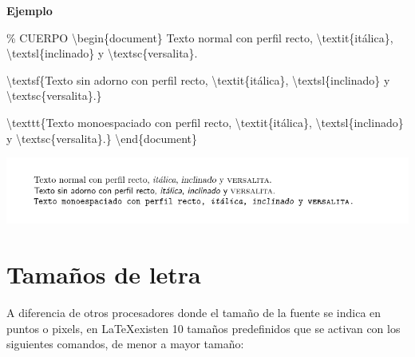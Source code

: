 \documentclass[
  letterpaper,
  DIV=11,
  numbers=noendperiod]{scrreport}
\newenvironment{Shaded}{\begin{snugshade}}{\end{snugshade}}
\newcommand{\CommentTok}[1]{\textcolor[rgb]{0.37,0.37,0.37}{#1}}
\newcommand{\ExtensionTok}[1]{\textcolor[rgb]{0.00,0.23,0.31}{#1}}
\newcommand{\FunctionTok}[1]{\textcolor[rgb]{0.28,0.35,0.67}{#1}}
\newcommand{\KeywordTok}[1]{\textcolor[rgb]{0.00,0.23,0.31}{#1}}
\newcommand{\NormalTok}[1]{\textcolor[rgb]{0.00,0.23,0.31}{#1}}
\begin{document}
\textbf{Ejemplo}

\begin{Shaded}
\begin{Highlighting}[]
\CommentTok{\% CUERPO}
\KeywordTok{\textbackslash{}begin}\NormalTok{\{}\ExtensionTok{document}\NormalTok{\}}
\NormalTok{Texto normal con perfil recto, }\FunctionTok{\textbackslash{}textit}\NormalTok{\{itálica\}, }\FunctionTok{\textbackslash{}textsl}\NormalTok{\{inclinado\} y }
\FunctionTok{\textbackslash{}textsc}\NormalTok{\{versalita\}.}

\FunctionTok{\textbackslash{}textsf}\NormalTok{\{Texto sin adorno con perfil recto, }\FunctionTok{\textbackslash{}textit}\NormalTok{\{itálica\}, }
\FunctionTok{\textbackslash{}textsl}\NormalTok{\{inclinado\} y }\FunctionTok{\textbackslash{}textsc}\NormalTok{\{versalita\}.\}}

\FunctionTok{\textbackslash{}texttt}\NormalTok{\{Texto monoespaciado con perfil recto, }\FunctionTok{\textbackslash{}textit}\NormalTok{\{itálica\}, }
\FunctionTok{\textbackslash{}textsl}\NormalTok{\{inclinado\} y }\FunctionTok{\textbackslash{}textsc}\NormalTok{\{versalita\}.\}}
\KeywordTok{\textbackslash{}end}\NormalTok{\{}\ExtensionTok{document}\NormalTok{\}}
\end{Highlighting}
\end{Shaded}

\begin{tcolorbox}[enhanced jigsaw, arc=.35mm, toprule=.15mm, opacitybacktitle=0.6, colback=white, coltitle=black, colbacktitle=quarto-callout-note-color!10!white, breakable, colframe=quarto-callout-note-color-frame, left=2mm, opacityback=0, bottomtitle=1mm, toptitle=1mm, titlerule=0mm, title={Salida}, bottomrule=.15mm, leftrule=.75mm, rightrule=.15mm]
\includegraphics{./img/formateo/perfiles-letra.png}
\end{tcolorbox}

\hypertarget{tamauxf1os-de-letra}{%
\section{Tamaños de letra}\label{tamauxf1os-de-letra}}

A diferencia de otros procesadores donde el tamaño de la fuente se
indica en puntos o pixels, en \LaTeX existen 10 tamaños predefinidos
que se activan con los siguientes comandos, de menor a mayor tamaño:
\end{document}

